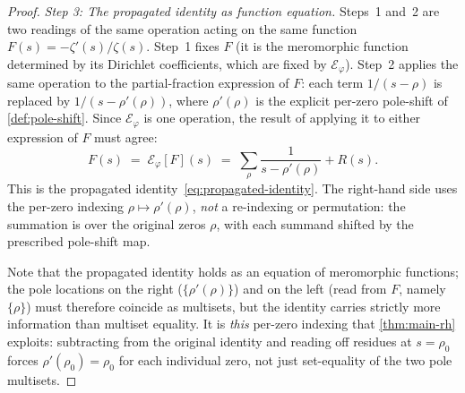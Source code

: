 \documentclass[11pt,a4paper]{article}
\theoremstyle{plain}
\theoremstyle{definition}
\theoremstyle{remark}
\numberwithin{equation}{section}
\newcommand{\vp}{\varphi}
\begin{document}
\begin{proof}
\smallskip\noindent\emph{Step 3: The propagated identity as
function equation.}
Steps~1 and~2 are two readings of the same operation acting on the
same function \(F(s)=-\zeta'(s)/\zeta(s)\).  Step~1 fixes \(F\) (it
is the meromorphic function determined by its Dirichlet
coefficients, which are fixed by \(\mathcal{E}_\vp\)).  Step~2
applies the same operation to the partial-fraction expression of
\(F\): each term \(1/(s-\rho)\) is replaced by \(1/(s-\rho'(\rho))\),
where \(\rho'(\rho)\) is the explicit per-zero pole-shift of
\cref{def:pole-shift}.  Since \(\mathcal{E}_\vp\) is one operation,
the result of applying it to either expression of \(F\) must agree:
\[
  F(s) \;=\; \mathcal{E}_\vp[F](s)
  \;=\; \sum_\rho \frac{1}{s-\rho'(\rho)} + R(s).
\]
This is the propagated identity~\eqref{eq:propagated-identity}.
The right-hand side uses the per-zero indexing \(\rho\mapsto
\rho'(\rho)\), \emph{not} a re-indexing or permutation: the
summation is over the original zeros \(\rho\), with each summand
shifted by the prescribed pole-shift map.

Note that the propagated identity holds as an equation of
meromorphic functions; the pole locations on the right
(\(\{\rho'(\rho)\}\)) and on the left (read from \(F\), namely
\(\{\rho\}\)) must therefore coincide as multisets, but the
identity carries strictly more information than multiset equality.
It is \emph{this} per-zero indexing that
\cref{thm:main-rh} exploits: subtracting from the original
identity and reading off residues at \(s=\rho_0\) forces
\(\rho'(\rho_0)=\rho_0\) for each individual zero, not just
set-equality of the two pole multisets.
\end{proof}
\end{document}
